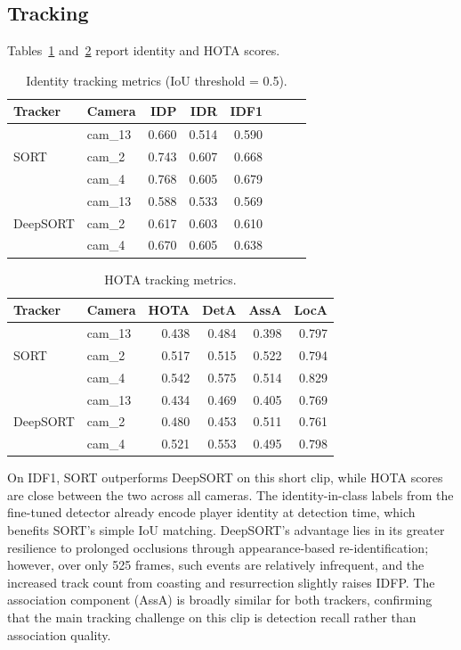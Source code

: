 \subsection{Tracking}

Tables~\ref{tab:identity} and~\ref{tab:hota} report identity and HOTA scores.

\begin{table}[t]
\centering
\caption{Identity tracking metrics (IoU threshold = 0.5).}
\label{tab:identity}
\small
\begin{tabular}{llrrrrrr}
\toprule
Tracker & Camera & IDP & IDR & IDF1 \\
\midrule
\multirow{3}{*}{SORT}
  & cam\_13 & 0.660 & 0.514 & 0.590 \\
  & cam\_2  & 0.743 & 0.607 & 0.668 \\
  & cam\_4  & 0.768 & 0.605 & 0.679 \\
\midrule
\multirow{3}{*}{DeepSORT}
  & cam\_13 & 0.588 & 0.533 & 0.569 \\
  & cam\_2  & 0.617 & 0.603 & 0.610 \\
  & cam\_4  & 0.670 & 0.605 & 0.638 \\
\bottomrule
\end{tabular}
\end{table}

\begin{table}[t]
\centering
\caption{HOTA tracking metrics.}
\label{tab:hota}
\small
\begin{tabular}{llrrrr}
\toprule
Tracker & Camera & HOTA & DetA & AssA & LocA \\
\midrule
\multirow{3}{*}{SORT}
  & cam\_13 & 0.438 & 0.484 & 0.398 & 0.797 \\
  & cam\_2  & 0.517 & 0.515 & 0.522 & 0.794 \\
  & cam\_4  & 0.542 & 0.575 & 0.514 & 0.829 \\
\midrule
\multirow{3}{*}{DeepSORT}
  & cam\_13 & 0.434 & 0.469 & 0.405 & 0.769 \\
  & cam\_2  & 0.480 & 0.453 & 0.511 & 0.761 \\
  & cam\_4  & 0.521 & 0.553 & 0.495 & 0.798 \\
\bottomrule
\end{tabular}
\end{table}

On IDF1, SORT outperforms DeepSORT on this short clip, while HOTA scores are close
between the two across all cameras.
The identity-in-class labels from the fine-tuned detector already encode player
identity at detection time, which benefits SORT's simple IoU matching.
DeepSORT's advantage lies in its greater resilience to prolonged occlusions through
appearance-based re-identification; however, over only 525 frames, such events are
relatively infrequent, and the increased track count from coasting and resurrection
slightly raises IDFP.
The association component (AssA) is broadly similar for both trackers, confirming
that the main tracking challenge on this clip is detection recall rather than
association quality.

